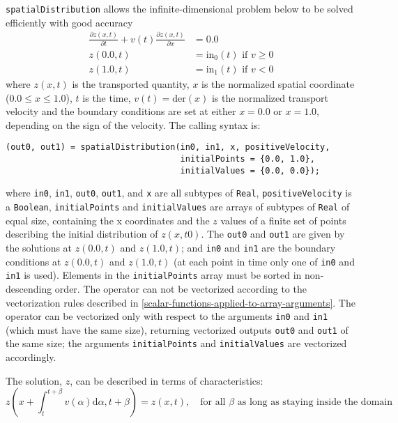 \lstinline!spatialDistribution! allows the infinite-dimensional problem below to be solved efficiently with good accuracy
\begin{align*}
\frac{\partial z(x,t)}{\partial t}+v(t)\frac{\partial z(x,t)}{\partial x} &= 0.0\\
z(0.0, t) &= \mathrm{in}_0(t) \text{ if $v\geq 0$}\\
z(1.0, t) &= \mathrm{in}_1(t) \text{ if $v<0$}
\end{align*}
where $z(x, t)$ is the transported quantity, $x$ is the normalized spatial coordinate ($0.0 \le x \le 1.0$), $t$ is the time, $v(t)=\mathrm{der}(x)$ is the normalized transport velocity and the boundary conditions are set at either $x=0.0$ or $x=1.0$, depending on the sign of the velocity.
The calling syntax is:
\begin{lstlisting}[language=modelica]
(out0, out1) = spatialDistribution(in0, in1, x, positiveVelocity,
                                   initialPoints = {0.0, 1.0},
                                   initialValues = {0.0, 0.0});
\end{lstlisting}
where \lstinline!in0!, \lstinline!in1!, \lstinline!out0!, \lstinline!out1!, and \lstinline!x! are all subtypes of \lstinline!Real!, \lstinline!positiveVelocity! is a \lstinline!Boolean!, \lstinline!initialPoints! and \lstinline!initialValues! are arrays of subtypes of \lstinline!Real! of equal size, containing the x coordinates and the $z$ values of a finite set of points describing the initial distribution of $z(x, \mathit{t0})$.
The \lstinline!out0! and \lstinline!out1! are given by the solutions at $z(0.0, t)$ and $z(1.0, t)$; and \lstinline!in0! and \lstinline!in1! are the boundary conditions at $z(0.0, t)$ and $z(1.0, t)$ (at each point in time only one of \lstinline!in0! and \lstinline!in1! is used).
Elements in the \lstinline!initialPoints! array must be sorted in non-descending order.
The operator can not be vectorized according to the vectorization rules described in \cref{scalar-functions-applied-to-array-arguments}.
The operator can be vectorized only with respect to the arguments \lstinline!in0! and \lstinline!in1! (which must have the same size), returning vectorized outputs \lstinline!out0! and \lstinline!out1! of the same size; the arguments \lstinline!initialPoints! and \lstinline!initialValues! are vectorized accordingly.

The solution, $z$, can be described in terms of characteristics:
\begin{equation*}
z(x+\int_{t}^{t+\beta} v(\alpha) \mathrm{d}\alpha, t+\beta) = z(x, t),\quad\text{for all $\beta$ as long as staying inside the domain}
\end{equation*}

